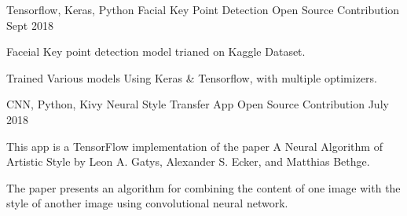 

\begin{cventries}


    \cventry
    {Tensorflow, Keras, Python} %
    {Facial Key Point Detection} %
    {Open Source Contribution} %
    {Sept 2018} %
    {
      \begin{cvitems} %
        \item {Faceial Key point detection model trianed on Kaggle Dataset.}
        \item {Trained Various models Using Keras \& Tensorflow, with multiple optimizers.}
      \end{cvitems}
    }
  
    \cventry
    {CNN, Python, Kivy} %
    {Neural Style Transfer App} %
    {Open Source Contribution} %
    {July 2018} %
    {
      \begin{cvitems} %
        \item {This app is a TensorFlow implementation of the paper A Neural Algorithm of Artistic Style by Leon A. Gatys, Alexander S. Ecker, and Matthias Bethge.}
        \item {The paper presents an algorithm for combining the content of one image with the style of another image using convolutional neural network.}
      \end{cvitems}
    }
  

\end{cventries}

